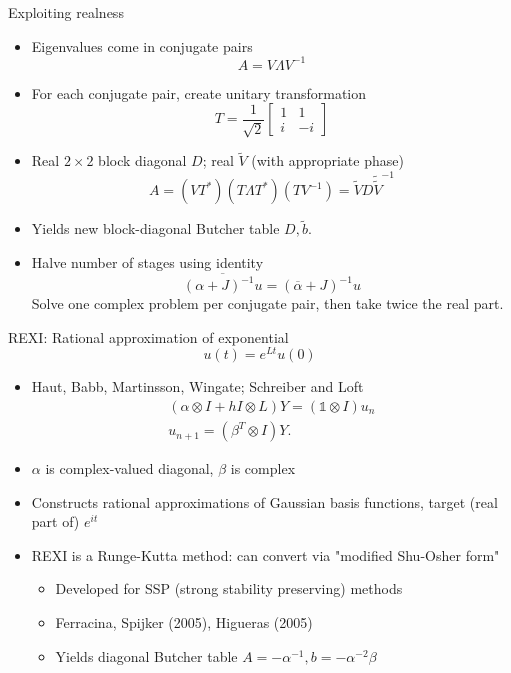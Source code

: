 \documentclass{beamer}
\begin{document}
\begin{frame}{Exploiting realness}
  \begin{itemize}
  \item Eigenvalues come in conjugate pairs
    $$ A = V \Lambda V^{-1} $$
  \item For each conjugate pair, create unitary transformation
    $$ T = \frac{1}{\sqrt 2} \begin{bmatrix} 1 & 1 \\ i & -i \end{bmatrix} $$
  \item Real $2\times 2$ block diagonal $D$; real $\tilde V$ (with appropriate phase)
    $$A = (V T^*) (T \Lambda T^*) (T V^{-1}) = \tilde V D \tilde \tilde V^{-1} $$
  \item Yields new block-diagonal Butcher table $D, \tilde b$.
    
  \item Halve number of stages using identity
    $$\overline{(\alpha + J)^{-1} u} = (\overline{\alpha} + J)^{-1} u $$
    Solve one complex problem per conjugate pair, then take twice the real part.
  \end{itemize}
\end{frame}

\begin{frame}{REXI: Rational approximation of exponential}
  $$ u(t) = e^{Lt} u(0) $$
  \begin{itemize}
  \item Haut, Babb, Martinsson, Wingate; Schreiber and Loft
    \begin{gather*} (\alpha \otimes I + h I \otimes L) Y = (\mathbb 1 \otimes I) u_n \\
      u_{n+1} = (\beta^T \otimes I) Y . \end{gather*}
  \item $\alpha$ is complex-valued diagonal, $\beta$ is complex
  \item Constructs rational approximations of Gaussian basis functions, target (real part of) $e^{it}$
  \item REXI is a Runge-Kutta method: can convert via "modified Shu-Osher form"
    \begin{itemize}
    \item Developed for SSP (strong stability preserving) methods
    \item Ferracina, Spijker (2005), Higueras (2005)
    \item Yields diagonal Butcher table $A = -\alpha^{-1}, b = -\alpha^{-2} \beta$
    \end{itemize}
  \end{itemize}
\end{frame}
\end{document}
